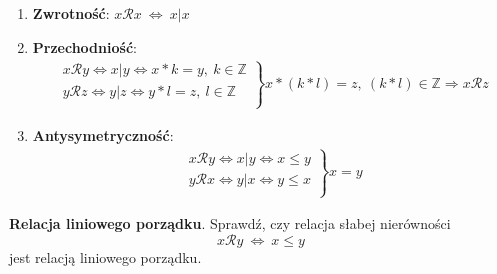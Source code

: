 \documentclass[12pt]{article}
\begin{document}
    \begin{enumerate}
        \item \textbf{Zwrotność}: $x \mathcal{R} x ~ \Leftrightarrow ~ x | x$
        \item \textbf{Przechodniość}:
        \begin{align*}
            \left.\begin{matrix}
                      x \mathcal{R} y \Leftrightarrow x|y \Leftrightarrow x*k = y, ~ k \in \mathbb{Z}\\
                      y \mathcal{R} z \Leftrightarrow y|z \Leftrightarrow y*l = z, ~ l \in \mathbb{Z}\\
            \end{matrix}\right\} x*(k*l) = z, ~ (k*l) \in \mathbb{Z} \Rightarrow x \mathcal{R} z
        \end{align*}
        \item \textbf{Antysymetryczność}:
        \begin{align*}
            \left.\begin{matrix}
                    x \mathcal{R} y \Leftrightarrow x|y \Leftrightarrow x \leq y\\
                    y \mathcal{R} x \Leftrightarrow y|x \Leftrightarrow y \leq x\\
        \end{matrix}\right\} x = y
        \end{align*}
    \end{enumerate}

    \begin{exercise}
        \textbf{Relacja liniowego porządku}. Sprawdź, czy relacja słabej nierówności
        \[ x \mathcal{R} y ~ \Leftrightarrow ~ x \leq y \]
        jest relacją liniowego porządku.
    \end{exercise}
\end{document}
